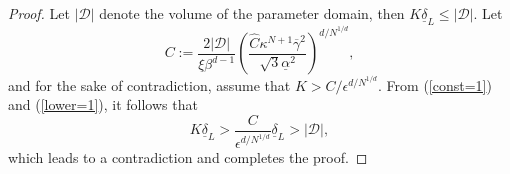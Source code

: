 \documentclass[12pt]{article}
\theoremstyle{remark}
\theoremstyle{definition}
\numberwithin{equation}{section}
\begin{document}
\begin{proof}
    Let $|\mathcal{D}|$ denote the volume of the parameter domain, then $K\underline{\delta}_L\leq |\mathcal{D}|$. Let 
    \begin{equation}
        C:=\frac{2|\mathcal{D}|}{\xi \beta^{d-1} } \left(\frac{\hat C \kappa ^{N+1}\overline{\gamma}^2}{\sqrt{3}\underline{\alpha}^2}\right)^{d/N^{1/d}},
        \label{const=1}
    \end{equation}
    and for the sake of contradiction, assume that $K>C/\epsilon^{d/N^{1/d}}$. From (\ref{const=1}) and (\ref{lower=1}), it follows that 
    \begin{equation}
        K\underline{\delta}_L>\frac{C}{\epsilon^{d/N^{1/d}}} \underline{\delta}_L > |\mathcal{D}|,
    \end{equation}
    which leads to a contradiction and completes the proof.
\end{proof}



\end{document}
